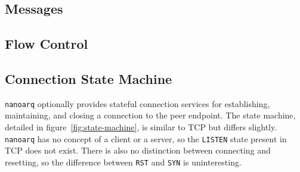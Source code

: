 \documentclass[11pt]{article}
\newcommand{\nanoarq}{\texttt{nanoarq}}
\begin{document}
\subsection{Messages}
\subsection{Flow Control}

\subsection{Connection State Machine}
\nanoarq{} optionally provides stateful connection services for establishing, maintaining, and closing a connection to the peer endpoint. The state machine, detailed in figure~\ref{fig:state-machine}, is similar to TCP but differs slightly. \nanoarq{} has no concept of a client or a server, so the \texttt{LISTEN} state present in TCP does not exist. There is also no distinction between connecting and resetting, so the difference between \texttt{RST} and \texttt{SYN} is uninteresting. \par
\end{document}
